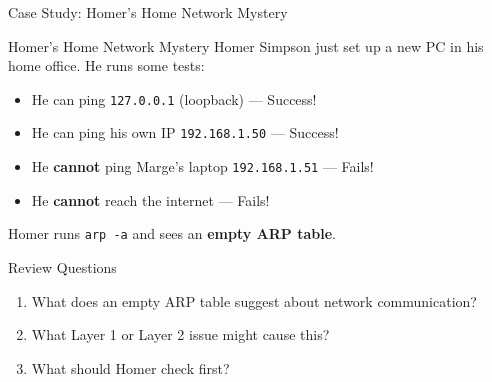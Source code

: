 \documentclass[aspectratio=169]{beamer}  %
\begin{document}
\begin{frame}{Case Study: Homer's Home Network Mystery}
    \begin{casestudy}{Homer's Home Network Mystery}
        Homer Simpson just set up a new PC in his home office. He runs some tests:
        
        \vspace{0.5em}
        \begin{itemize}
            \item He can ping \texttt{127.0.0.1} (loopback) --- \textcolor{networkgreen}{Success!}
            \item He can ping his own IP \texttt{192.168.1.50} --- \textcolor{networkgreen}{Success!}
            \item He \textbf{cannot} ping Marge's laptop \texttt{192.168.1.51} --- \textcolor{alertred}{Fails!}
            \item He \textbf{cannot} reach the internet --- \textcolor{alertred}{Fails!}
        \end{itemize}
        
        \vspace{0.5em}
        Homer runs \texttt{arp -a} and sees an \textbf{empty ARP table}.
    \end{casestudy}
    
    \begin{block}{Review Questions}
        \begin{enumerate}
            \item What does an empty ARP table suggest about network communication?
            \item What Layer 1 or Layer 2 issue might cause this?
            \item What should Homer check first?
        \end{enumerate}
    \end{block}
\end{frame}
\end{document}
